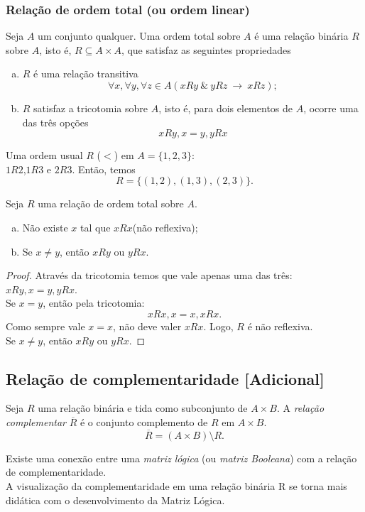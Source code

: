       \subsubsection{Relação de ordem total (ou ordem linear)}
         \begin{definition}
            Seja $A$ um conjunto qualquer. Uma ordem total sobre $A$ é uma relação binária $R$ sobre $A$, isto é, $R \subseteq A \times A$, que satisfaz as seguintes propriedades
            \begin{enumerate}[a.]
               \item $R$ é uma relação transitiva $$\forall x, \forall y, \forall z \in A (xRy\ \&\ yRz\ \rightarrow\ xRz);$$
               \item $R$ satisfaz a tricotomia sobre $A$, isto é, para dois elementos de $A$, ocorre uma das três opções
               $$xRy, x=y, yRx$$
            \end{enumerate}
         \end{definition}
         \begin{exmp}
            Uma ordem usual $R$ ($<$) em $A=\{1,2,3\}$:\\
            $1R2$,$1R3$ e $2R3$. Então, temos $$R = \{(1,2),(1,3),(2,3)\}.$$
         \end{exmp}
         \begin{theorem}
            Seja $R$ uma relação de ordem total sobre $A$.
            \begin{enumerate}[a.]
               \item Não existe $x$ tal que $xRx$\quad (não reflexiva);
               \item Se $x \neq y$, então $xRy$ ou $yRx$.
            \end{enumerate}
            \begin{proof}
               Através da tricotomia temos que vale apenas uma das três: $xRy, x=y, yRx$.\\
               Se $x=y$, então pela tricotomia: $$xRx, x=x, xRx.$$
               Como sempre vale $x=x$, não deve valer $xRx$. Logo, $R$ é não reflexiva.\\
               Se $x\neq y$, então $xRy$ ou $yRx$.
            \end{proof}
         \end{theorem}

      \subsection{Relação de complementaridade [Adicional]}
         \begin{definition}
            Seja $R$ uma relação binária e tida como subconjunto de $A \times B$. A \emph{relação complementar} $\overline{R}$ é o conjunto complemento de $R$ em $A \times B$.
            $$\overline{R} = (A \times B) \setminus R.$$  
         \end{definition}
         Existe uma conexão entre uma \emph{matriz lógica} (ou \emph{matriz Booleana}) com a relação de complementaridade.\\
         A visualização da complementaridade em uma relação binária R se torna mais didática com o desenvolvimento da Matriz Lógica.

